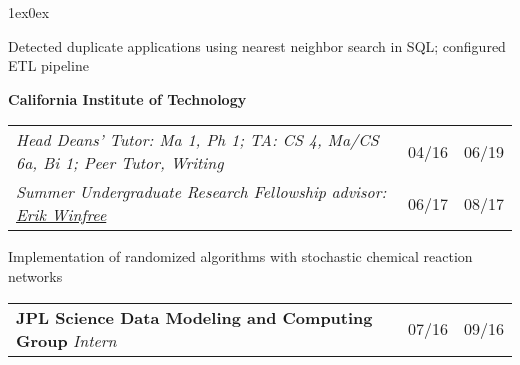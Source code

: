 \documentclass[12pt]{article}
\def\myh{20pt}
\def\indentlen{1ex}
\newcommand{\datecolor}{lavender3}
\let\oldbold\textbf
\renewcommand{\textbf}[1]{\oldbold{\color{boldpurple} #1}}
\let\olditalic\textit
\renewcommand{\textit}[1]{\olditalic{\color{lavender} #1}}
\newcommand{\textittwo}[1]{\olditalic{\color{lavender2} #1}}
\newcommand{\mysmallerverticalspace}{\vspace{2pt}}
\newcommand{\datecolwidth}{29pt}
\newcommand{\titlecolwidth}{\textwidth - \datecolwidth*3 + \myh/2 - 5pt}
\begin{document}
{\begin{adjustwidth}{\indentlen}{0ex}
\color{normaltext}

Detected duplicate applications using nearest neighbor search in SQL; configured ETL pipeline

\mysmallerverticalspace

\textbf{\hspace{-\indentlen}California Institute of Technology}

\color{\datecolor}

\begin{tabular}{@{}p{\titlecolwidth}r@{|}p{\datecolwidth}@{}}
\textit{Head Deans' Tutor: Ma 1, Ph 1; TA: CS 4, Ma/CS 6a, Bi 1; Peer Tutor, Writing} & 04/16 & 06/19 \\
\textit{Summer Undergraduate Research Fellowship} \hspace{\rolesep} \textittwo{advisor: \href{https://www.dna.caltech.edu/~winfree/}{Erik Winfree}} & 06/17 & 08/17
\end{tabular}

\color{normaltext}

Implementation of randomized algorithms with stochastic chemical reaction networks

\color{\datecolor}

\mysmallerverticalspace

\begin{tabular}{@{}p{\titlecolwidth}r@{|}p{\datecolwidth}@{}}
\textbf{\hspace{-\indentlen}JPL Science Data Modeling and Computing Group} \hspace{\rolesep} \textit{Intern} & 07/16 & 09/16
\end{tabular}

\end{adjustwidth}

\color{normaltext}
\vspace{-4pt}
}

\newlength\myhplus
\setlength{\myhplus}{\myh-2pt}
\vspace{-\myhplus}  %
\let\myhplus\relax
\end{document}
